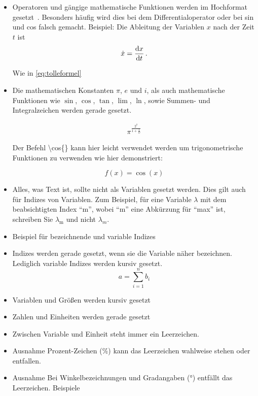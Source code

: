 \begin{itemize}

\item Operatoren und gängige mathematische Funktionen werden im Hochformat gesetzt~\cite{RedBook2010}. Besonders häufig wird dies bei dem Differentialoperator oder bei sin und cos falsch gemacht. Beispiel: Die Ableitung der Variablen $x$ nach der Zeit $t$ ist
\begin{equation}
\dot{x}=\frac{\mathrm{d} x}{\mathrm{d} t} \, .
\label{eq:derivative}
\end{equation}


Wie in \ref{eq:tolleformel}
\item Die mathematischen Konstanten $\pi$, $e$ und $i$, als auch mathematische Funktionen wie $\sin$, $\cos$, $\tan$, $\lim$, $\ln$, sowie Summen- und Integralzeichen werden gerade gesetzt.

\begin{align}
    \pi^{\frac{2^7}{1+\frac{1}{\Omega}}}\label{eq:tolleformel}
\end{align}

Der Befehl \textbackslash cos\{\} kann hier leicht verwendet werden um trigonometrische Funktionen zu verwenden wie hier demonstriert:

\begin{equation}
    f(x) = \cos{(x)} 
\end{equation}

\item Alles, was Text ist, sollte nicht als Variablen gesetzt werden. Dies gilt auch für Indizes von Variablen. Zum Beispiel, für eine Variable $\lambda$ mit dem beabsichtigten Index ``m'', wobei ``m'' eine Abkürzung für ``max'' ist, schreiben Sie $\lambda_{\mathrm{m}}$ und nicht $\lambda_m$.
\item Beispiel für bezeichnende und variable Indizes
\item Indizes werden gerade gesetzt, wenn sie die Variable näher bezeichnen. Lediglich variable Indizes werden kursiv gesetzt.
\begin{equation}
    a = \sum^{n}_{i=1} b_i
\end{equation}
    \item Variablen und Größen werden kursiv gesetzt
\item Zahlen und Einheiten werden gerade gesetzt
\item Zwischen Variable und Einheit steht immer ein Leerzeichen. 
\item Ausnahme Prozent-Zeichen (\%) kann das Leerzeichen wahlweise stehen oder entfallen.
\item Ausnahme Bei Winkelbezeichnungen und Gradangaben (°) entfällt das Leerzeichen.
Beispiele


\end{itemize}
